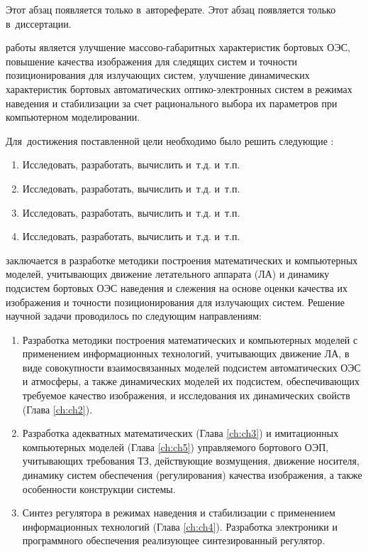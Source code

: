 \ifsynopsis
Этот абзац появляется только в~автореферате.
\else
Этот абзац появляется только в~диссертации.
\fi


{\aim} работы является улучшение массово-габаритных характеристик бортовых ОЭС, повышение качества изображения для следящих систем и точности позиционирования для излучающих систем, улучшение динамических характеристик бортовых автоматических оптико-электронных систем в режимах наведения и стабилизации за счет рационального выбора их параметров при компьютерном моделировании.

Для~достижения поставленной цели необходимо было решить следующие {\tasks}:
\begin{enumerate}
  \item Исследовать, разработать, вычислить и~т.\:д. и~т.\:п.
  \item Исследовать, разработать, вычислить и~т.\:д. и~т.\:п.
  \item Исследовать, разработать, вычислить и~т.\:д. и~т.\:п.
  \item Исследовать, разработать, вычислить и~т.\:д. и~т.\:п.
\end{enumerate}


{\novelty} заключается в разработке методики построения математических и компьютерных моделей, учитывающих движение летательного аппарата (ЛА) и динамику подсистем бортовых ОЭС наведения и слежения на основе оценки качества их изображения и точности позиционирования для излучающих систем. Решение научной задачи проводилось по следующим направлениям:
\begin{enumerate}
  \item Разработка методики построения математических и компьютерных моделей с применением информационных технологий, учитывающих движение ЛА, в виде совокупности взаимосвязанных моделей подсистем автоматических ОЭС и атмосферы, а также динамических моделей их подсистем, обеспечивающих требуемое качество изображения, и исследования их динамических свойств (Глава \ref{ch:ch2}). 
  \item Разработка адекватных математических (Глава \ref{ch:ch3}) и имитационных компьютерных моделей (Глава \ref{ch:ch5}) управляемого бортового ОЭП, учитывающих требования ТЗ, действующие возмущения, движение носителя, динамику систем обеспечения (регулирования) качества изображения, а также особенности конструкции системы. 
  \item Синтез регулятора в режимах наведения и стабилизации с применением информационных технологий (Глава \ref{ch:ch4}). Разработка электроники и программного обеспечения реализующее синтезированный регулятор.
\end{enumerate}

